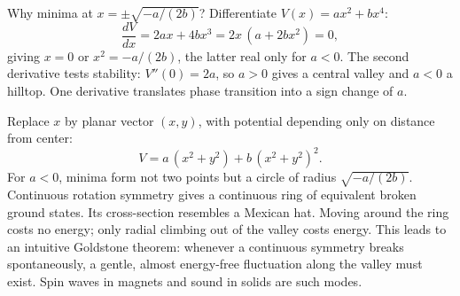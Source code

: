 \begin{mathbridge}
Why minima at \(x=\pm\sqrt{-a/(2b)}\)? Differentiate \(V(x)=ax^{2}+bx^{4}\):
\[
\frac{dV}{dx}=2ax+4bx^{3}=2x\,(a+2bx^{2})=0,
\]
giving \(x=0\) or \(x^{2}=-a/(2b)\), the latter real only for \(a<0\). The second derivative tests stability: \(V''(0)=2a\), so \(a>0\) gives a central valley and \(a<0\) a hilltop. One derivative translates phase transition into a sign change of \(a\).

Replace \(x\) by planar vector \((x,y)\), with potential depending only on distance from center:
\[
V=a\,(x^{2}+y^{2})+b\,(x^{2}+y^{2})^{2}.
\]
For \(a<0\), minima form not two points but a circle of radius \(\sqrt{-a/(2b)}\). Continuous rotation symmetry gives a continuous ring of equivalent broken ground states. Its cross-section resembles a Mexican hat. Moving around the ring costs no energy; only radial climbing out of the valley costs energy. This leads to an intuitive Goldstone theorem: whenever a continuous symmetry breaks spontaneously, a gentle, almost energy-free fluctuation along the valley must exist. Spin waves in magnets and sound in solids are such modes.
\end{mathbridge}

\begin{center}
\end{center}



